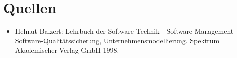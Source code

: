 \slidetitle{}
\section{Quellen}

\begin{itemize}

\item Helmut Balzert: Lehrbuch der Software-Technik - Software-Management Software-Qualitätssicherung, Unternehmensmodellierung. Spektrum Akademischer Verlag GmbH 1998.

\end{itemize}